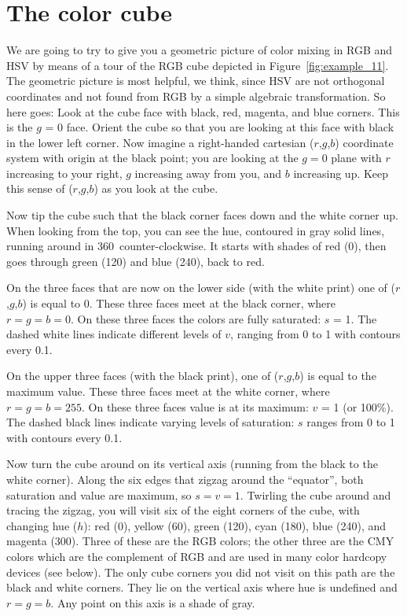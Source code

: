 \section{The color cube}
We are going to try to give you a geometric picture of color
mixing in RGB and HSV by means of a tour of the RGB cube depicted in Figure~\ref{fig:example_11}.  The geometric
picture is most helpful, we think, since HSV are not orthogonal
coordinates and not found from RGB by a simple algebraic transformation.
So here goes: Look at the
cube face with black, red, magenta, and blue corners.
This is the $g$ = 0 face.  Orient the cube so that you are
looking at this face with black in the lower left corner.  Now
imagine a right-handed cartesian ($r$,$g$,$b$) coordinate system
with origin at the black point; you are looking at the $g = 0$
plane with $r$ increasing to your right, $g$ increasing
away from you, and $b$ increasing up.  Keep this sense of
($r$,$g$,$b$) as you look at the cube.

Now tip the cube such that the black corner faces down and the white corner up. When looking from the top, you can see the hue, contoured in gray solid lines, running around in 360\DS\ counter-clockwise. It starts with shades of red (0\DS), then goes through green (120\DS) and blue (240\DS), back to red.

On the three faces that are now on the lower side (with the white print) one of ($r$,$g$,$b$) is equal to 0. These three faces meet at the black corner, where $r = g = b = 0$. On these three faces the colors are fully saturated: $s$ = 1. The dashed white lines indicate different levels of $v$, ranging from 0 to 1 with contours every 0.1.

On the upper three faces (with the black print), one of ($r$,$g$,$b$) is equal to the
maximum value.  These three faces meet at the white corner, where
$r = g = b = 255$.  On these three faces value is at
its maximum: $v$ = 1 (or 100\%). The dashed black lines indicate varying levels of saturation: $s$ ranges from 0 to
1 with contours every 0.1.

Now turn the cube around on its vertical axis (running from the black to the white corner). Along the six edges that zigzag around the ``equator'', both saturation and value are maximum, so $s = v = 1$. Twirling the cube around and tracing the zigzag, you will visit six of the eight corners of the
cube, with changing hue ($h$):  red (0\DS), yellow (60\DS), green
(120\DS), cyan (180\DS), blue (240\DS), and magenta
(300\DS). Three of these are the RGB colors; the other three
are the CMY colors which are the complement of RGB and are used in many
color hardcopy devices (see below).  The only cube
corners you did not visit on this path are the black and white corners.
They lie on the vertical axis where hue is undefined and $r = g = b$. Any point on this axis is a shade of gray.

